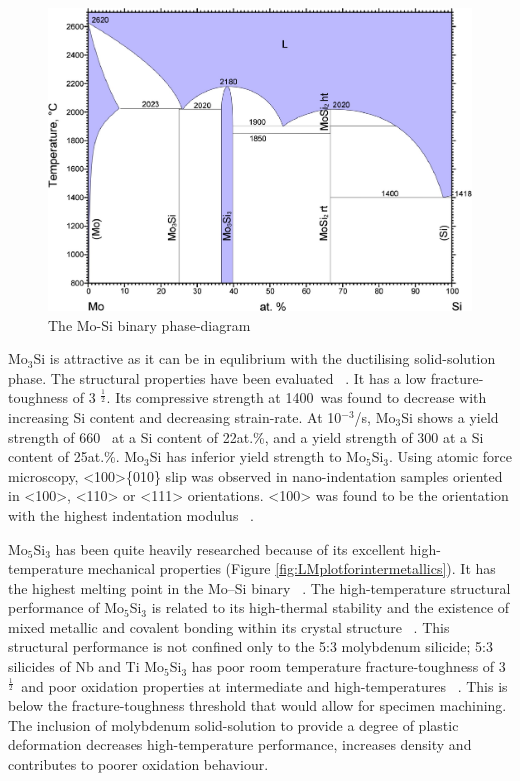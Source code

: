 %
\vspace{6mm}
\begin{figure}[H]
\begin{center}
\includegraphics[width=15cm]{MoSi}
\caption{The Mo-Si binary phase-diagram ~\cite{svechnikov70}}
\label{fig:MoSi}
\end{center}
\end{figure}
%

\clearpage
Mo$_3$Si is attractive as it can be in equlibrium with the ductilising solid-solution phase. The structural properties have been evaluated ~\cite{rosales00, swadener01}.  It has a low fracture-toughness of 3 \mega\pascal\m$^{\frac{1}{2}}$.  Its compressive strength at 1400\celsius\ was found to decrease with increasing Si content and decreasing strain-rate.  At 10$^{-3}$/s, Mo$_3$Si shows a yield strength of 660 \mega\pascal\ at a Si content of 22at.\%, and a yield strength of 300 \mega\pascal at a Si content of 25at.\%.   Mo$_3$Si has inferior yield strength to Mo$_5$Si$_3$.  Using atomic force microscopy, <100>\{010\} slip was observed in nano-indentation samples oriented in <100>, <110> or <111> orientations.  <100> was found to be the orientation with the highest indentation modulus ~\cite{swadener01}.

Mo$_5$Si$_3$ has been quite heavily researched because of its excellent high-temperature mechanical properties (Figure \ref{fig:LMplotforintermetallics}).  It has the highest melting point in the Mo--Si binary ~\cite{svechnikov70}.  The high-temperature structural performance of Mo$_5$Si$_3$ is related to its high-thermal stability and the existence of mixed metallic and covalent bonding within its crystal structure ~\cite{sakidja08}.  This structural performance is not confined only to the 5:3 molybdenum silicide; 5:3 silicides of Nb and Ti Mo$_5$Si$_3$ has poor room temperature fracture-toughness of 3  \mega\pascal\m$^{\frac{1}{2}}$\ and poor oxidation properties at intermediate and high-temperatures ~\cite{akinc99, anton89, anton89b}.  This is below the fracture-toughness threshold that would allow for specimen machining.  The inclusion of molybdenum solid-solution to provide a degree of plastic deformation decreases high-temperature performance, increases density and contributes to poorer oxidation behaviour.  

